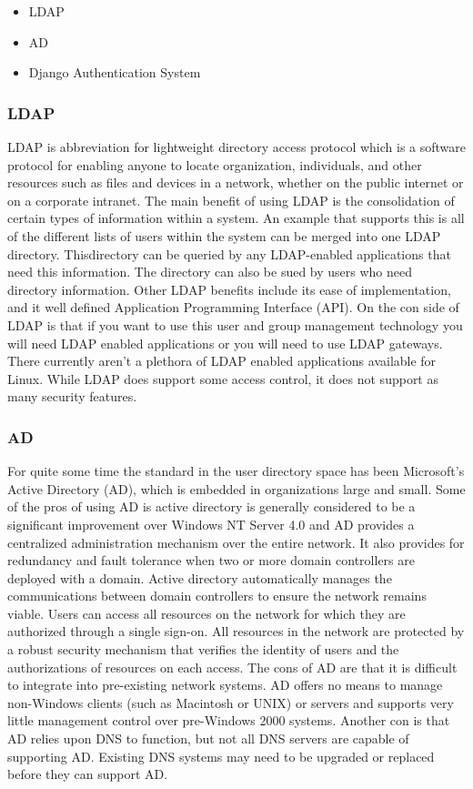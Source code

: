 \documentclass[draftclsnofoot,10pt,onecolumn]{IEEEtran} %
\begin{document}
	\begin{itemize}
		\item LDAP
		\item AD
		\item Django Authentication System \\
	\end{itemize}
	
\subsubsection{LDAP}
LDAP is abbreviation for lightweight directory access protocol which is a software protocol for enabling anyone to locate
organization, individuals, and other resources such as files and devices in a network, whether on the public internet or on a
corporate intranet. The main benefit of using LDAP is the consolidation of certain types of information within a system. An
example that supports this is all of the different lists of users within the system can be merged into one LDAP directory. Thisdirectory can be queried by any LDAP-enabled applications that need this information. The directory can also be sued by
users who need directory information. Other LDAP benefits include its ease of implementation, and it well defined
Application Programming Interface (API). On the con side of LDAP is that if you want to use this user and group
management technology you will need LDAP enabled applications or you will need to use LDAP gateways. There currently
aren’t a plethora of LDAP enabled applications available for Linux. While LDAP does support some access control, it does
not support as many security features. \\

\subsubsection{AD}
For quite some time the standard in the user directory space has been Microsoft’s Active Directory (AD), which is embedded
in organizations large and small. Some of the pros of using AD is active directory is generally considered to be a significant
improvement over Windows NT Server 4.0 and AD provides a centralized administration mechanism over the entire
network. It also provides for redundancy and fault tolerance when two or more domain controllers are deployed with a
domain. Active directory automatically manages the communications between domain controllers to ensure the network
remains viable. Users can access all resources on the network for which they are authorized through a single sign-on. All
resources in the network are protected by a robust security mechanism that verifies the identity of users and the
authorizations of resources on each access. The cons of AD are that it is difficult to integrate into pre-existing network
systems. AD offers no means to manage non-Windows clients (such as Macintosh or UNIX) or servers and supports very
little management control over pre-Windows 2000 systems. Another con is that AD relies upon DNS to function, but not all
DNS servers are capable of supporting AD. Existing DNS systems may need to be upgraded or replaced before they can
support AD. \\
\end{document}
